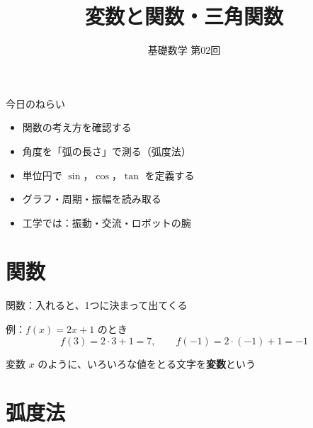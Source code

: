 \documentclass[aspectratio=169]{beamer}
\title{変数と関数・三角関数}
\subtitle{基礎数学 第02回}
\author{}
\date{}
\begin{document}
\begin{frame}
  \titlepage
\end{frame}

\begin{frame}{今日のねらい}
  \bigskip
  \begin{itemize}
    \item 関数の考え方を確認する
    \item 角度を「弧の長さ」で測る（弧度法）
    \item 単位円で $\sin$，$\cos$，$\tan$ を定義する
    \item グラフ・周期・振幅を読み取る
    \item 工学では：振動・交流・ロボットの腕
  \end{itemize}
\end{frame}

\section{関数}

\begin{frame}{関数：入れると、1つに決まって出てくる}
  \begin{center}
  \end{center}
  \medskip
  例：$f(x) = 2x + 1$ のとき
  \[
    f(3) = 2 \cdot 3 + 1 = 7, \qquad f(-1) = 2 \cdot (-1) + 1 = -1
  \]
  \begin{block}{変数}
    $x$ のように、いろいろな値をとる文字を\textbf{変数}という
  \end{block}
\end{frame}

\section{弧度法}
\end{document}
